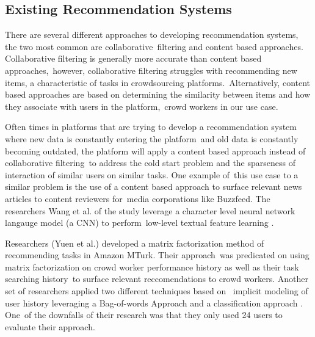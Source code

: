 \documentclass[letterpaper,12pt]{article}
\begin{document}
\subsection{Existing Recommendation Systems}
There are several different approaches to developing recommendation systems, the two most common are collaborative\
filtering and content based approaches. Collaborative filtering is generally more accurate than content based approaches,\
however, collaborative filtering struggles with recommending new items, a characteristic of tasks in crowdsourcing platforms.\
Alternatively, content based approaches are based on determining the similarity between items and how they associate with users in the platform,\
crowd workers in our use case.

Often times in platforms that are trying to develop a recommendation system where new data is constantly entering the platform\
and old data is constantly becoming outdated, the platform will apply a content based approach instead of collaborative filtering\
to address the cold start problem and the sparseness of interaction of similar users on similar tasks. One example of\
this use case to a similar problem is the use of a content based approach to surface relevant news articles to content reviewers for\
media corporations like Buzzfeed. The researchers Wang et al. of the study leverage a character level neural network langauge model (a CNN) to perform\
low-level textual feature learning \cite{wang2017dynamic}.

Researchers (Yuen et al.) developed a matrix factorization method of recommending tasks in Amazon MTurk. \cite{yuen2012task} Their approach\
was predicated on using matrix factorization on crowd worker performance history as well as their task searching history\
to surface relevant reccomendations to crowd workers. Another set of researchers applied two different techniques based on \
implicit modeling of user history leveraging a Bag-of-words Approach and a classification approach \cite{ambati2011towards}. One\
of the downfalls of their research was that they only used 24 users to evaluate their approach.

\end{document}
